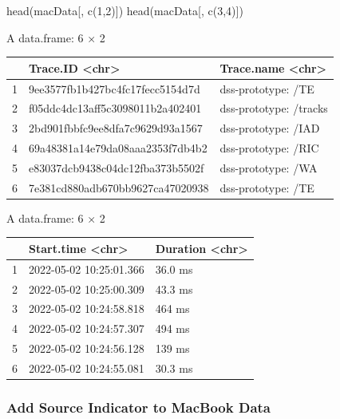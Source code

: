 \documentclass[
  letterpaper,
  DIV=11,
  numbers=noendperiod]{scrartcl}
\newenvironment{Shaded}{\begin{snugshade}}{\end{snugshade}}
\newcommand{\DecValTok}[1]{\textcolor[rgb]{0.68,0.00,0.00}{#1}}
\newcommand{\FunctionTok}[1]{\textcolor[rgb]{0.28,0.35,0.67}{#1}}
\newcommand{\NormalTok}[1]{\textcolor[rgb]{0.00,0.23,0.31}{#1}}
\begin{document}
\begin{Shaded}
\begin{Highlighting}[]
\FunctionTok{head}\NormalTok{(macData[, }\FunctionTok{c}\NormalTok{(}\DecValTok{1}\NormalTok{,}\DecValTok{2}\NormalTok{)])}
\FunctionTok{head}\NormalTok{(macData[, }\FunctionTok{c}\NormalTok{(}\DecValTok{3}\NormalTok{,}\DecValTok{4}\NormalTok{)])}
\end{Highlighting}
\end{Shaded}

A data.frame: 6 × 2

\begin{longtable}[]{@{}lll@{}}
\toprule()
& Trace.ID \textless chr\textgreater{} & Trace.name
\textless chr\textgreater{} \\
\midrule()
\endhead
1 & 9ee3577fb1b427bc4fc17fecc5154d7d & dss-prototype: /TE \\
2 & f05ddc4dc13aff5c3098011b2a402401 & dss-prototype: /tracks \\
3 & 2bd901fbbfc9ee8dfa7c9629d93a1567 & dss-prototype: /IAD \\
4 & 69a48381a14e79da08aaa2353f7db4b2 & dss-prototype: /RIC \\
5 & e83037dcb9438c04dc12fba373b5502f & dss-prototype: /WA \\
6 & 7e381cd880adb670bb9627ca47020938 & dss-prototype: /TE \\
\bottomrule()
\end{longtable}

A data.frame: 6 × 2

\begin{longtable}[]{@{}lll@{}}
\toprule()
& Start.time \textless chr\textgreater{} & Duration
\textless chr\textgreater{} \\
\midrule()
\endhead
1 & 2022-05-02 10:25:01.366 & 36.0 ms \\
2 & 2022-05-02 10:25:00.309 & 43.3 ms \\
3 & 2022-05-02 10:24:58.818 & 464 ms \\
4 & 2022-05-02 10:24:57.307 & 494 ms \\
5 & 2022-05-02 10:24:56.128 & 139 ms \\
6 & 2022-05-02 10:24:55.081 & 30.3 ms \\
\bottomrule()
\end{longtable}

\hypertarget{add-source-indicator-to-macbook-data}{%
\subsubsection{Add Source Indicator to MacBook
Data}\label{add-source-indicator-to-macbook-data}}
\end{document}

